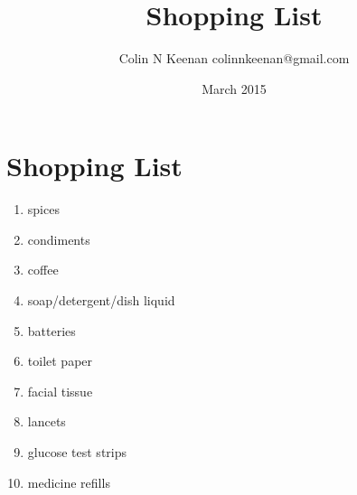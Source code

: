 \documentclass[12pt,letterpaper]{article}
\newcommand{\mytitle}{Shopping List}
\begin{document}
\title{\mytitle{}}
\author{Colin N Keenan colinnkeenan@gmail.com}
\date{March 2015}
\section*{\mytitle{}}
\begin{enumerate}
	\item spices
	\item condiments
	\item coffee
	\item soap/detergent/dish liquid
	\item batteries
	\item toilet paper
	\item facial tissue
	\item lancets
	\item glucose test strips
	\item medicine refills
\end{enumerate}
\end{document}
